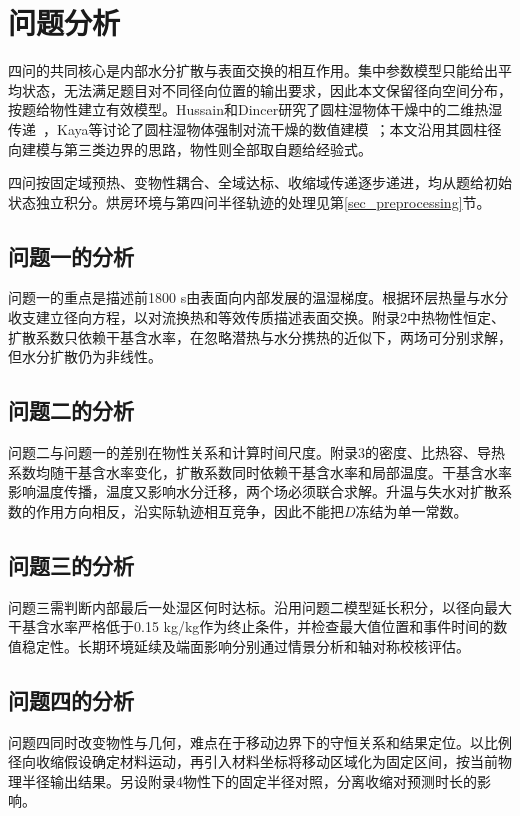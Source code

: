 \section{问题分析}
四问的共同核心是内部水分扩散与表面交换的相互作用。集中参数模型只能给出平均状态，无法满足题目对不同径向位置的输出要求，因此本文保留径向空间分布，按题给物性建立有效模型。Hussain和Dincer研究了圆柱湿物体干燥中的二维热湿传递~\cite{hussain2003}，Kaya等讨论了圆柱湿物体强制对流干燥的数值建模~\cite{kaya2007}；本文沿用其圆柱径向建模与第三类边界的思路，物性则全部取自题给经验式。

四问按固定域预热、变物性耦合、全域达标、收缩域传递逐步递进，均从题给初始状态独立积分。烘房环境与第四问半径轨迹的处理见第\ref{sec_preprocessing}节。

\subsection{问题一的分析}
问题一的重点是描述前1800 s由表面向内部发展的温湿梯度。根据环层热量与水分收支建立径向方程，以对流换热和等效传质描述表面交换。附录2中热物性恒定、扩散系数只依赖干基含水率，在忽略潜热与水分携热的近似下，两场可分别求解，但水分扩散仍为非线性。

\subsection{问题二的分析}
问题二与问题一的差别在物性关系和计算时间尺度。附录3的密度、比热容、导热系数均随干基含水率变化，扩散系数同时依赖干基含水率和局部温度。干基含水率影响温度传播，温度又影响水分迁移，两个场必须联合求解。升温与失水对扩散系数的作用方向相反，沿实际轨迹相互竞争，因此不能把$D$冻结为单一常数。

\subsection{问题三的分析}
问题三需判断内部最后一处湿区何时达标。沿用问题二模型延长积分，以径向最大干基含水率严格低于0.15 kg/kg作为终止条件，并检查最大值位置和事件时间的数值稳定性。长期环境延续及端面影响分别通过情景分析和轴对称校核评估。

\subsection{问题四的分析}
问题四同时改变物性与几何，难点在于移动边界下的守恒关系和结果定位。以比例径向收缩假设确定材料运动，再引入材料坐标将移动区域化为固定区间，按当前物理半径输出结果。另设附录4物性下的固定半径对照，分离收缩对预测时长的影响。
\FloatBarrier
